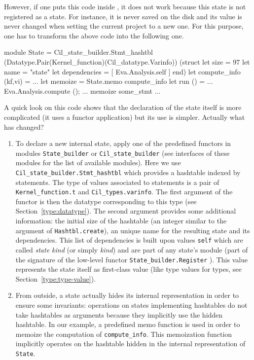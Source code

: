 However, if one puts this code inside \framac, it does not work because this
state is not registered as a \framac state. For instance, it is never saved on
the disk and its value is never changed when setting the current
project to a new one. For this purpose, one has to transform the above code into
the following one. 
 
 
 
\begin{ocamlcode}
module State =
  Cil_state_builder.Stmt_hashtbl
    (Datatype.Pair(Kernel_function)(Cil_datatype.Varinfo))
    (struct
      let size = 97
      let name = "state"
      let dependencies = [ Eva.Analysis.self ]
     end)
let compute_info (kf,vi) = ...
let memoize = State.memo compute_info
let run () = ... Eva.Analysis.compute (); ... memoize some_stmt ...
\end{ocamlcode}
A quick look on this code shows that the declaration of the state itself is more
complicated (it uses a functor application) but its use is
simpler. Actually what has changed?
\begin{enumerate}
\item To declare a new internal state, apply one of the predefined functors in
  modules \texttt{State\_builder} or
  \texttt{Cil\_state\_builder} (see interfaces of
  these modules for the list of available modules). Here we use
  \texttt{Cil\_state\_builder.Stmt\_hashtbl} which provides a hashtable indexed
  by statements. The type of values associated to statements is a pair of
  \texttt{Kernel\_function.t} and
  \texttt{Cil\_types.varinfo}. The first argument
  of the functor is then the datatype corresponding to this type
  (see Section~\ref{type:datatype}). The second argument provides some
  additional information: the initial size of the hashtable (an
  integer similar to the argument of \texttt{Hashtbl.create}), an unique
  name for the resulting state and its
  dependencies. This list of dependencies is built
  upon values \texttt{self} which are called \emph{state
    kind} (or simply \emph{kind})
  and are part of any state's module (part of the signature of the low-level
  functor \texttt{State\_builder.Register}%
  ). This value represents the state itself
  as first-class value (like type values for \caml types, see
  Section~\ref{type:type-value}).
\item From outside, a state actually hides its internal representation in order
  to ensure some invariants: operations on states implementing hashtables do
  not take hashtables as arguments because they implicitly use the hidden
  hashtable. In our example, a predefined memo function is used in order to
  memoize the computation of \texttt{compute\_info}. This
  memoization function implicitly operates on the hashtable hidden in the
  internal representation of \texttt{State}.
\end{enumerate}

